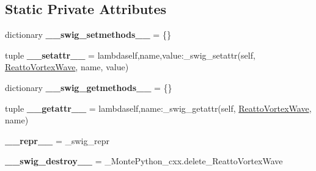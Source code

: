 \subsection*{Static Private Attributes}
\begin{DoxyCompactItemize}
\item 
\hypertarget{classMontePython__cxx_1_1ReattoVortexWave_a2a0007f1d0c0934c723a809be285c5b8}{}dictionary {\bfseries \+\_\+\+\_\+swig\+\_\+setmethods\+\_\+\+\_\+} = \{\}\label{classMontePython__cxx_1_1ReattoVortexWave_a2a0007f1d0c0934c723a809be285c5b8}

\item 
\hypertarget{classMontePython__cxx_1_1ReattoVortexWave_a2d97bca3937592c812d2bf043f98880f}{}tuple {\bfseries \+\_\+\+\_\+setattr\+\_\+\+\_\+} = lambdaself,name,value\+:\+\_\+swig\+\_\+setattr(self, \hyperlink{classMontePython__cxx_1_1ReattoVortexWave}{Reatto\+Vortex\+Wave}, name, value)\label{classMontePython__cxx_1_1ReattoVortexWave_a2d97bca3937592c812d2bf043f98880f}

\item 
\hypertarget{classMontePython__cxx_1_1ReattoVortexWave_a3a978a10cfe9b98d3d371578a818d9d7}{}dictionary {\bfseries \+\_\+\+\_\+swig\+\_\+getmethods\+\_\+\+\_\+} = \{\}\label{classMontePython__cxx_1_1ReattoVortexWave_a3a978a10cfe9b98d3d371578a818d9d7}

\item 
\hypertarget{classMontePython__cxx_1_1ReattoVortexWave_a876253c581a9fefddc389614c81d5d24}{}tuple {\bfseries \+\_\+\+\_\+getattr\+\_\+\+\_\+} = lambdaself,name\+:\+\_\+swig\+\_\+getattr(self, \hyperlink{classMontePython__cxx_1_1ReattoVortexWave}{Reatto\+Vortex\+Wave}, name)\label{classMontePython__cxx_1_1ReattoVortexWave_a876253c581a9fefddc389614c81d5d24}

\item 
\hypertarget{classMontePython__cxx_1_1ReattoVortexWave_a3464012126b8c449b399707ba782c276}{}{\bfseries \+\_\+\+\_\+repr\+\_\+\+\_\+} = \+\_\+swig\+\_\+repr\label{classMontePython__cxx_1_1ReattoVortexWave_a3464012126b8c449b399707ba782c276}

\item 
\hypertarget{classMontePython__cxx_1_1ReattoVortexWave_af7084054e4de28adc23055ea67caa4a6}{}{\bfseries \+\_\+\+\_\+swig\+\_\+destroy\+\_\+\+\_\+} = \+\_\+\+Monte\+Python\+\_\+cxx.\+delete\+\_\+\+Reatto\+Vortex\+Wave\label{classMontePython__cxx_1_1ReattoVortexWave_af7084054e4de28adc23055ea67caa4a6}

\end{DoxyCompactItemize}


